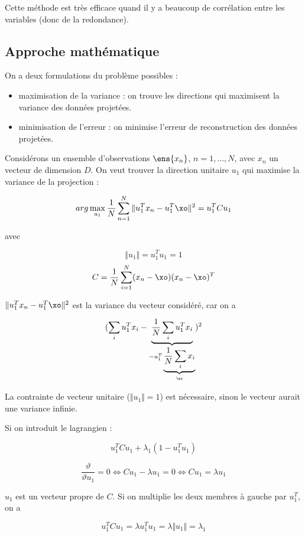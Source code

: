 		
	
	Cette méthode est très efficace quand il y a beaucoup de corrélation entre les variables (donc de la redondance).
	
	
	\subsection{Approche mathématique}
	
	On a deux formulations du problème possibles :
	
	\begin{itemize}
		\item maximisation de la variance : on trouve les directions qui maximisent la variance des données projetées.
		\item minimisation de l'erreur : on minimise l'erreur de reconstruction des données projetées.
	\end{itemize}
	
	Considérons un ensemble d'observations $\ens{x_n}$, $n = 1, \dots , N$, avec $x_n$ un vecteur de dimension $D$. On veut trouver la direction unitaire $u_1$ qui maximise la variance de la projection :
	
	$$arg \max_{u_1} \frac{1}{N} \sum_{n = 1}^N \Vert u_1^T x_n - u_1^T \xo \Vert^2 = u_1^TCu_1$$
	
	avec
	
	$$\Vert u_1 \Vert = u_1^Tu_1 = 1$$
	$$C = \frac{1}{N} \sum_{i = 1}^N (x_n - \xo)(x_n - \xo)^T$$
	
	$\Vert u_1^T x_n - u_1^T \xo \Vert^2$ est la variance du vecteur considéré, car on a
	
	$$(\sum_i u_1^Tx_i - \underbrace{\frac{1}{N} \sum_i u_1^Tx_i}_{-u_1^T \underbrace{\frac{1}{N} \sum_i x_i}_{\xo}})^2$$
	
	La contrainte de vecteur unitaire ($\Vert u_1 \Vert = 1$) est nécessaire, sinon le vecteur aurait une variance infinie.
	
	Si on introduit le lagrangien :
	
	$$u_1^T Cu_1 + \lambda_1(1 - u_1^Tu_1)$$
	
	$$\frac{\vartheta}{\vartheta u_1} = 0 \Leftrightarrow Cu_1 - \lambda u_1 = 0 \Leftrightarrow Cu_1 = \lambda u_1$$
	
	$u_1$ est un vecteur propre de $C$. Si on multiplie les deux membres à gauche par $u_1^T$, on a
	
	$$u_1^TCu_1 = \lambda u_1^Tu_1 = \lambda \Vert u_1 \Vert = \lambda_1$$
	
